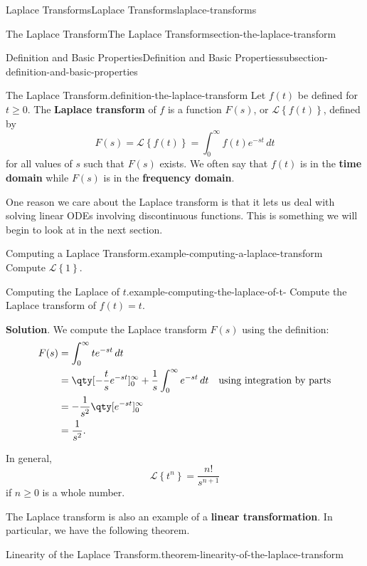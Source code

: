 \documentclass[oneside,10pt,]{book}
\newcommand{\terminology}[1]{\textbf{#1}}
\numberwithin{equation}{section}
\newcommand{\Int}[2]{\int_{#1}^{#2}}
\newcommand{\amp}{&}
\begin{document}
\begin{chapterptx}{Laplace Transforms}{}{Laplace Transforms}{}{}{laplace-transforms}
\begin{sectionptx}{The Laplace Transform}{}{The Laplace Transform}{}{}{section-the-laplace-transform}
\begin{subsectionptx}{Definition and Basic Properties}{}{Definition and Basic Properties}{}{}{subsection-definition-and-basic-properties}
\begin{definition}{The Laplace Transform.}{definition-the-laplace-transform}%
\hypertarget{p-489}{}%
Let \(f(t)\) be defined for \(t\geq0\). The \terminology{Laplace transform} of \(f\) is a function \(F(s)\), or \(\mathcal{L}\left\{ f(t) \right\}\), defined by%
\begin{equation*}
F(s) = \mathcal{L}\left\{ f(t) \right\} = \Int{0}{\infty}f(t)e^{-st}\,dt
\end{equation*}
for all values of \(s\) such that \(F(s)\) exists. We often say that \(f(t)\) is in the \terminology{time domain} while \(F(s)\) is in the \terminology{frequency domain}.%
\end{definition}
\hypertarget{p-490}{}%
One reason we care about the Laplace transform is that it lets us deal with solving linear ODEs involving discontinuous functions. This is something we will begin to look at in the next section.%
\begin{example}{Computing a Laplace Transform.}{example-computing-a-laplace-transform}%
\hypertarget{p-491}{}%
Compute \(\mathcal{L}\left\{ 1 \right\}\).%
\end{example}
\begin{example}{Computing the Laplace of \(t\).}{example-computing-the-laplace-of-t-}%
\hypertarget{p-492}{}%
Compute the Laplace transform of \(f(t) = t\).%
\par\smallskip%
\noindent\textbf{Solution}.\hypertarget{solution-77}{}\quad%
\hypertarget{p-493}{}%
We compute the Laplace transform \(F(s)\) using the definition:%
\begin{align*}
F(s) \amp= \Int{0}{\infty}te^{-st}\,dt\\
\amp= \qty[-\frac{t}{s}e^{-st}]_{0}^{\infty} + \frac{1}{s}\Int{0}{\infty}e^{-st}\,dt \amp\text{using integration by parts}\\
\amp= -\frac{1}{s^{2}}\qty[e^{-st}]_{0}^{\infty}\\
\amp= \frac{1}{s^{2}}\text{.}
\end{align*}
%
\end{example}
\hypertarget{p-494}{}%
In general,%
\begin{equation*}
\mathcal{L}\left\{t^{n}\right\} = \frac{n!}{s^{n+1}}
\end{equation*}
if \(n\geq0\) is a whole number.%
\par
\hypertarget{p-495}{}%
The Laplace transform is also an example of a \terminology{linear transformation}. In particular, we have the following theorem.%
\begin{theorem}{Linearity of the Laplace Transform.}{}{theorem-linearity-of-the-laplace-transform}%

\end{theorem}
\end{subsectionptx}
\end{sectionptx}
\end{chapterptx}
\end{document}
